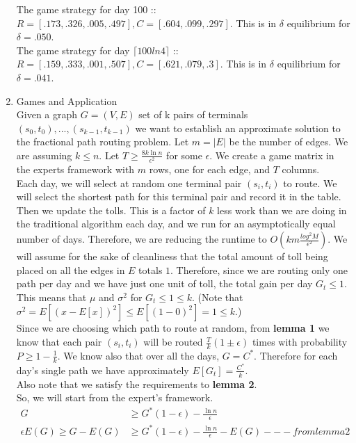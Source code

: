 \documentclass[a4paper]{article}
\begin{document}
\begin{enumerate}
The game strategy for day 100 :: $R = [.173, .326, .005, .497], C = [.604, .099, .297]$.  This is in $\delta$ equilibrium for $\delta = .050$.\\
The game strategy for day $\lceil 100 ln 4 \rceil$ :: $R = [.159, .333, .001, .507], C = [.621, .079, .3]$.  This is in $\delta$ equilibrium for $\delta = .041$.\\
\item Games and Application \\
Given a graph $G = (V, E)$ set of k pairs of terminals ${(s_0, t_0), ..., (s_{k-1}, t_{k-1})}$ we want to establish an approximate solution to the fractional path routing problem.  Let $m = |E|$ be the number of edges.  We are assuming $k \leq n$.  Let $T \geq \frac{8k \ln n}{\epsilon^2}$ for some $\epsilon$.  We create a game matrix in the experts framework with $m$ rows, one for each edge, and $T$ columns.\\
Each day, we will select at random one terminal pair $(s_i, t_i)$ to route.  We will select the shortest path for this terminal pair and record it in the table.  Then we update the tolls.  This is a factor of $k$ less work than we are doing in the traditional algorithm each day, and we run for an asymptotically equal number of days.  Therefore, we are reducing the runtime to $O(km\frac{log^2 M}{\epsilon ^ 2})$.  We will assume for the sake of cleanliness that the total amount of toll being placed on all the edges in $E$ totals $1$.  Therefore, since we are routing only one path per day and we have just one unit of toll, the total gain per day $G_t \leq 1$.  This means that $\mu$ and $\sigma ^2$ for $G_t \leq 1 \leq k$.  (Note that $\sigma ^2 = E[(x-E[x])^2] \leq E[(1 - 0) ^ 2] = 1 \leq k$.)\\
Since we are choosing which path to route at random, from \textbf{lemma 1} we know that each pair $(s_i, t_i)$ will be routed $\frac{T}{k}(1 \pm \epsilon)$ times with probability $P \geq 1 - \frac{1}{k}$.  We know also that over all the days, $G = C^*$.  Therefore for each day's single path we have approximately $E[G_t] = \frac{C^*}{k}$.\\
Also note that we satisfy the requirements to \textbf{lemma 2}. \\
So, we will start from the expert's framework.\\
	\begin{align*}
		G &\geq G^*(1-\epsilon)-\frac{\ln n}{\epsilon}\\
		\epsilon E(G) \geq G - E(G) &\geq G^* (1-\epsilon) - \frac{\ln n}{\epsilon} - E(G) --- from lemma 2 \\

\end{align*}
\end{enumerate}
\end{document}
